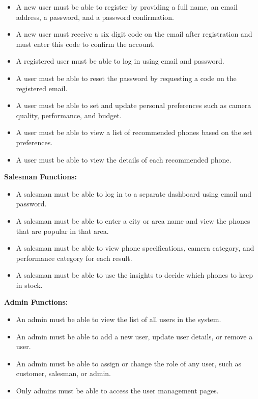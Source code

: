 \documentclass[12pt, a4paper]{report}
\numberwithin{equation}{chapter}
\begin{document}
\begin{itemize}

\item A new user must be able to register by providing a full name, an email address, a password, and a password confirmation.

\item A new user must receive a six digit code on the email after registration and must enter this code to confirm the account.

\item A registered user must be able to log in using email and password.

\item A user must be able to reset the password by requesting a code on the registered email.

\item A user must be able to set and update personal preferences such as camera quality, performance, and budget.

\item A user must be able to view a list of recommended phones based on the set preferences.

\item A user must be able to view the details of each recommended phone.

\end{itemize}

\textbf{Salesman Functions:}

\begin{itemize}

\item A salesman must be able to log in to a separate dashboard using email and password.

\item A salesman must be able to enter a city or area name and view the phones that are popular in that area.

\item A salesman must be able to view phone specifications, camera category, and performance category for each result.

\item A salesman must be able to use the insights to decide which phones to keep in stock.

\end{itemize}

\textbf{Admin Functions:}

\begin{itemize}

\item An admin must be able to view the list of all users in the system.

\item An admin must be able to add a new user, update user details, or remove a user.

\item An admin must be able to assign or change the role of any user, such as customer, salesman, or admin.

\item Only admins must be able to access the user management pages.

\end{itemize}
\end{document}
